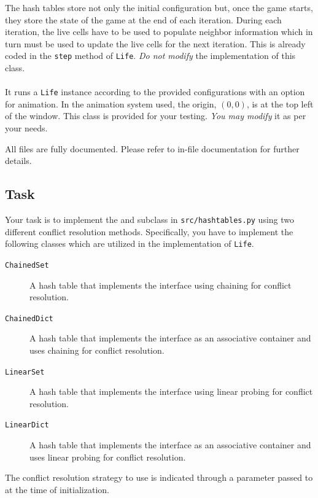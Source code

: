 \documentclass[addpoints]{exam}
\begin{document}
The hash tables store not only the initial configuration but, once the game starts, they store the state of the game at the end of each iteration. During each iteration, the live cells have to be used to populate neighbor information which in turn must be used to update the live cells for the next iteration. This is already coded in the \texttt{step} method of \texttt{Life}. \textit{Do not modify} the implementation of this class.

\paragraph{} It runs a \texttt{Life} instance according to the provided configurations with an option for animation. In the animation system used, the origin, $(0,0)$, is at the top left of the window. This class is provided for your testing. \textit{You may modify} it as per your needs.


All files are fully documented. Please refer to in-file documentation for further details.

\subsection{Task}

Your task is to implement the  and  subclass in \texttt{src/hashtables.py} using two different conflict resolution methods. Specifically, you have to implement the following classes which are utilized in the implementation of \texttt{Life}.
\begin{description}
\item[\texttt{ChainedSet}] A hash table that implements the  interface using chaining for conflict resolution.
\item[\texttt{ChainedDict}] A hash table that implements the  interface as an associative container and uses chaining for conflict resolution.
\item[\texttt{LinearSet}] A hash table that implements the  interface using linear probing for conflict resolution.
\item[\texttt{LinearDict}] A hash table that implements the  interface as an associative container and uses linear probing for conflict resolution.
\end{description}
The conflict resolution strategy to use is indicated through a parameter passed to  at the time of initialization.
\end{document}
